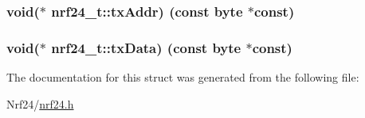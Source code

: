 \subsubsection[{tx\+Addr}]{\setlength{\rightskip}{0pt plus 5cm}void($\ast$ nrf24\+\_\+t\+::tx\+Addr) (const {\bf byte} $\ast$const)}\label{structnrf24__t_abfc805d8cb41f8a3bf611a76a5d830db}
\hypertarget{structnrf24__t_a1dbfdf83bc96820d8a24cb7a34f58ef8}{}
\subsubsection[{tx\+Data}]{\setlength{\rightskip}{0pt plus 5cm}void($\ast$ nrf24\+\_\+t\+::tx\+Data) (const {\bf byte} $\ast$const)}\label{structnrf24__t_a1dbfdf83bc96820d8a24cb7a34f58ef8}


The documentation for this struct was generated from the following file\+:\begin{DoxyCompactItemize}
\item 
Nrf24/\hyperlink{nrf24_8h}{nrf24.\+h}\end{DoxyCompactItemize}
